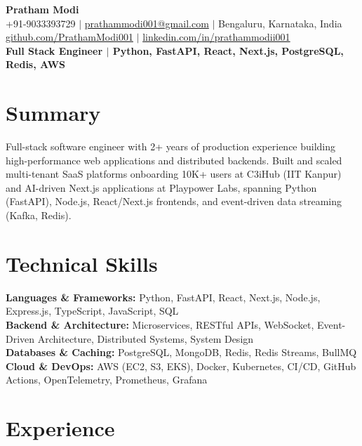 \documentclass[10pt]{article}
\begin{document}
\begin{center}
{\Huge \textbf{Pratham Modi}} \\[2pt]
+91-9033393729 $\vert$ \href{mailto:prathammodi001@gmail.com}{prathammodi001@gmail.com} $\vert$ Bengaluru, Karnataka, India \\[1pt]
\href{https://github.com/PrathamModi001}{github.com/PrathamModi001} $\vert$ \href{https://www.linkedin.com/in/prathammodii001/}{linkedin.com/in/prathammodii001} \\[2pt]
\textbf{Full Stack Engineer $\vert$ Python, FastAPI, React, Next.js, PostgreSQL, Redis, AWS}

\end{center}

\vspace{-6pt}
\section{Summary}
Full-stack software engineer with 2+ years of production experience building high-performance web applications and distributed backends. Built and scaled multi-tenant SaaS platforms onboarding 10K+ users at C3iHub (IIT Kanpur) and AI-driven Next.js applications at Playpower Labs, spanning Python (FastAPI), Node.js, React/Next.js frontends, and event-driven data streaming (Kafka, Redis).

\section{Technical Skills}
\textbf{Languages \& Frameworks:} Python, FastAPI, React, Next.js, Node.js, Express.js, TypeScript, JavaScript, SQL \\
\textbf{Backend \& Architecture:} Microservices, RESTful APIs, WebSocket, Event-Driven Architecture, Distributed Systems, System Design \\
\textbf{Databases \& Caching:} PostgreSQL, MongoDB, Redis, Redis Streams, BullMQ \\
\textbf{Cloud \& DevOps:} AWS (EC2, S3, EKS), Docker, Kubernetes, CI/CD, GitHub Actions, OpenTelemetry, Prometheus, Grafana \\

\section{Experience}
\end{document}
